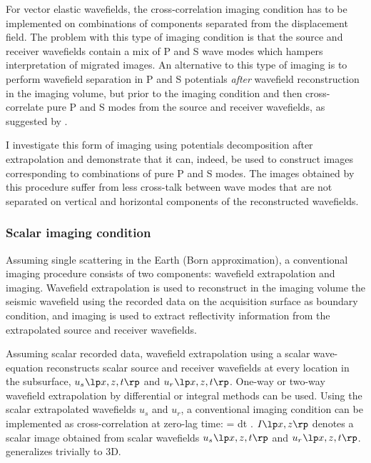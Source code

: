 
For vector elastic wavefields, the cross-correlation imaging condition has to be implemented on combinations of components separated from the displacement field. The problem with this type of imaging condition is that the source and receiver wavefields contain a mix of P and S wave modes which hampers interpretation of migrated images. An alternative to this type of imaging is to perform wavefield separation in P and S potentials \emph{after} wavefield reconstruction in the imaging volume, but prior to the imaging condition and then cross-correlate pure P and S modes from the source and receiver wavefields, as suggested by \cite{GEO55-07-09140919}.

I investigate this form of imaging using potentials decomposition after extrapolation and demonstrate that it can, indeed, be used to construct images corresponding to combinations of pure P and S modes. The images obtained by this procedure suffer from less  cross-talk between wave modes that are not separated on vertical and horizontal components of the reconstructed wavefields.
\subsubsection{Scalar imaging condition}
Assuming single scattering in the Earth (Born approximation), a conventional imaging procedure consists of two components: wavefield extrapolation and imaging. Wavefield extrapolation is used to reconstruct in the imaging volume the seismic wavefield using the recorded data on the acquisition surface as boundary condition, and imaging is used to extract reflectivity information from the extrapolated source and receiver wavefields.

Assuming scalar recorded data, wavefield extrapolation using a scalar wave-equation reconstructs scalar source and receiver wavefields at every location in the subsurface, $\US{}$ and $\UR{}$. One-way or two-way wavefield extrapolation by differential or integral methods can be used. Using the scalar extrapolated wavefields $u_s$ and $u_r$, a conventional imaging condition \cite[]{Claerbout.iei} can be implemented as cross-correlation at zero-lag time: 
\beq \label{eqn:CIC}
\IM{} = \int \US{} \UR{} dt \;.
\eeq
$\IM{}$ denotes a scalar image obtained from scalar wavefields $\US{}$ and $\UR{}$.  generalizes trivially to 3D.
